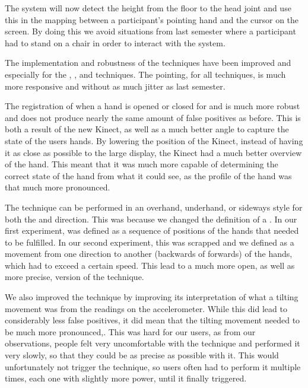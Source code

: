 The system will now detect the height from the floor to the head joint and use this in the mapping between a participant's pointing hand and the cursor on the screen.
By doing this we avoid situations from last semester where a participant had to stand on a chair in order to interact with the system.

The implementation and robustness of the techniques have been improved and especially for the \grab, \throw, and \tilt techniques.
The pointing, for all techniques, is much more responsive and without as much jitter as last semester.

The registration of when a hand is opened or closed for \grab \push and \grab \pull is much more robust and does not produce nearly the same amount of false positives as before.
This is both a result of the new Kinect, as well as a much better angle to capture the state of the users hands. 
By lowering the position of the Kinect, instead of having it as close as possible to the large display, the Kinect had a much better overview of the hand.
This meant that it was much more capable of determining the correct state of the hand from what it could see, as the profile of the hand was that much more pronounced.
   
The \throw technique can be performed in an overhand, underhand, or sideways style for both the \pull and \push direction.
This was because we changed the definition of a \throw.
In our first experiment, \throw was defined as a sequence of positions of the hands that needed to be fulfilled. 
In our second experiment, this was scrapped and we defined \throw as a movement from one direction to another (backwards of forwards) of the hands, which had to exceed a certain speed.
This lead to a much more open, as well as more precise, version of the \throw technique. 

We also improved the \tilt technique by improving its interpretation of what a tilting movement was from the readings on the accelerometer. 
While this did lead to considerably less false positives, it did mean that the tilting movement needed to be much more pronounced,.
This was hard for our users, as from our observations, people felt very uncomfortable with the \tilt technique and performed it very slowly, so that they could be as precise as possible with it. 
This would unfortunately not trigger the technique, so users often had to perform it multiple times, each one with slightly more power, until it finally triggered.  


